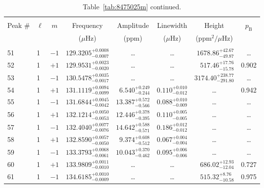 \begin{table*}[!]
\caption{Table~\ref{tab:8475025m} continued.}
\label{tab:8475025m2}
\centering
\begin{tabular}{llcrrlrc}
\hline\hline
\\[-8pt]          
Peak \# & $\ell$ & $m$ & \multicolumn{1}{c}{Frequency} & \multicolumn{1}{c}{Amplitude} & \multicolumn{1}{c}{Linewidth} & \multicolumn{1}{c}{Height}& $p_\mathrm{B}$\\
 & & & \multicolumn{1}{c}{($\mu$Hz)} & \multicolumn{1}{c}{(ppm)} & \multicolumn{1}{c}{($\mu$Hz)} & \multicolumn{1}{c}{(ppm$^2/\mu$Hz)}\\
\hline \\[-8pt]
51 & 1 & $-1$ & $    129.3205_{-      0.0007}^{+      0.0008}$ & \multicolumn{1}{c}{\dots} & \multicolumn{1}{c}{\dots} & $     1678.86_{-       49.87}^{+       42.67}$ & \dots \\[1pt]
52 & 1 & $+1$ & $    129.9531_{-      0.0020}^{+      0.0023}$ & \multicolumn{1}{c}{\dots} & \multicolumn{1}{c}{\dots} & $      517.46_{-       15.78}^{+       17.76}$ & 0.902\\[1pt]
53 & 1 & $-1$ & $    130.5478_{-      0.0017}^{+      0.0035}$ & \multicolumn{1}{c}{\dots} & \multicolumn{1}{c}{\dots} & $     3174.40_{-      291.80}^{+      238.77}$ & \dots \\[1pt]
54 & 1 & $+1$ & $    131.1119_{-      0.0099}^{+      0.0094}$ & $       6.540_{-       0.244}^{+       0.249}$ & $       0.110_{-       0.012}^{+       0.010}$ & \multicolumn{1}{c}{\dots} & 0.942\\[1pt]
55 & 1 & $-1$ & $    131.6844_{-      0.0042}^{+      0.0045}$ & $      13.387_{-       0.566}^{+       0.572}$ & $       0.088_{-       0.009}^{+       0.010}$ & \multicolumn{1}{c}{\dots} & \dots \\[1pt]
56 & 1 & $+1$ & $    132.1214_{-      0.0053}^{+      0.0050}$ & $      12.446_{-       0.395}^{+       0.378}$ & $       0.110_{-       0.005}^{+       0.005}$ & \multicolumn{1}{c}{\dots} & \dots \\[1pt]
57 & 1 & $-1$ & $    132.4040_{-      0.0076}^{+      0.0077}$ & $      14.642_{-       0.571}^{+       0.588}$ & $       0.186_{-       0.012}^{+       0.012}$ & \multicolumn{1}{c}{\dots} & \dots \\[1pt]
58 & 1 & $+1$ & $    132.8590_{-      0.0050}^{+      0.0057}$ & $       9.374_{-       0.512}^{+       0.608}$ & $       0.067_{-       0.004}^{+       0.004}$ & \multicolumn{1}{c}{\dots} & \dots \\[1pt]
59 & 1 & $-1$ & $    133.3793_{-      0.0061}^{+      0.0068}$ & $      10.043_{-       0.462}^{+       0.370}$ & $       0.095_{-       0.006}^{+       0.006}$ & \multicolumn{1}{c}{\dots} & \dots \\[1pt]
60 & 1 & $+1$ & $    133.9809_{-      0.0010}^{+      0.0011}$ & \multicolumn{1}{c}{\dots} & \multicolumn{1}{c}{\dots} & $      686.02_{-       12.04}^{+       12.93}$ & 0.727\\[1pt]
61 & 1 & $-1$ & $    134.6185_{-      0.0009}^{+      0.0010}$ & \multicolumn{1}{c}{\dots} & \multicolumn{1}{c}{\dots} & $      515.32_{-       10.58}^{+        8.76}$ & 0.975\\[1pt]
 

\end{tabular}
\end{table*}
